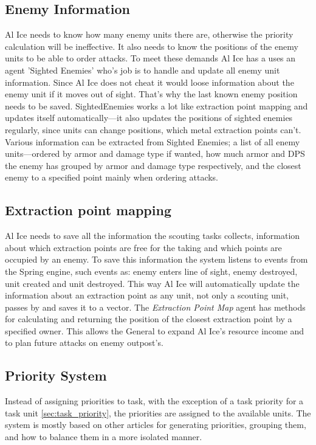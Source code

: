 \subsection{Enemy Information}
\label{sec:enemy_information}
Al Ice needs to know how many enemy units there are, otherwise the priority calculation will be
ineffective. It also needs to know the positions of the enemy units to be able to order attacks. To
meet these demands Al Ice has a uses an agent 'Sighted Enemies' who's
job is to handle and update all enemy unit information. Since Al Ice does not cheat it would loose information about the enemy unit
if it moves out of sight. That's why the last known enemy position needs to be saved. SightedEnemies
works a lot like extraction point mapping and updates itself
automatically---it also updates the positions of sighted enemies regularly, since units can
change positions, which metal extraction points can't. Various information can be extracted from
Sighted Enemies; a list of all enemy units---ordered by armor and damage type if wanted, how much
armor and DPS the enemy has grouped by armor and damage type respectively, and the closest enemy to
a specified point mainly when ordering attacks.


\subsection{Extraction point mapping}
\label{sec:extraction_point_mapping}
Al Ice needs to save all the information the scouting tasks collects,
information about which extraction points are free for the taking and which points are occupied by an
enemy. To save this information the system listens to events from the Spring engine, such events as: enemy enters line
of sight, enemy destroyed, unit created and unit destroyed. This way Al Ice will automatically
update the information about an extraction point as any unit, not only a scouting unit, passes by
and saves it to a vector. The \emph{Extraction Point Map} agent has methods for calculating and
returning the position of the closest extraction point by a specified owner. This allows the
General to expand Al Ice's resource income and to plan future attacks on enemy
outpost's.

\subsection{Priority System}
\label{sec:priority_system}
Instead of assigning priorities to task, with the exception of a task priority for a task unit
\ref{sec:task_priority}, the priorities are assigned to the available units. The system is mostly
based on other articles \cite{Dill06,Dill08} for generating priorities, grouping them, and how to
balance them in a more isolated manner.

